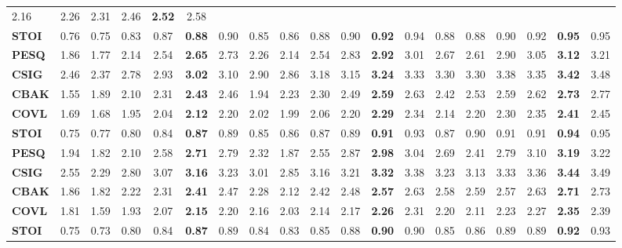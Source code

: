 \documentclass[10pt,twocolumn,letterpaper]{article}
\begin{document}
\begin{table*}[ht]
\begin{tabular}{l||ccc|cc|c||ccc|cc|c||ccc|cc|c}
                    2.16 & 2.26 & 2.31 & 2.46 & \textbf{2.52} & 2.58\\
    \textbf{STOI} & 0.76 & 0.75 & 0.83 & 0.87 & \textbf{0.88} & 0.90 &
                    0.85 & 0.86 & 0.88 & 0.90 & \textbf{0.92} & 0.94 &
                    0.88 & 0.88 & 0.90 & 0.92 & \textbf{0.95} & 0.95\\
    \hline
    \hline
    \textbf{PESQ} & 1.86 & 1.77 & 2.14 & 2.54 & \textbf{2.65} & 2.73 &
                    2.26 & 2.14 & 2.54 & 2.83 & \textbf{2.92} & 3.01 &
                    2.67 & 2.61 & 2.90 & 3.05 & \textbf{3.12} & 3.21\\
    \textbf{CSIG} & 2.46 & 2.37 & 2.78 & 2.93 & \textbf{3.02} & 3.10 &
                    2.90 & 2.86 & 3.18 & 3.15 & \textbf{3.24} & 3.33 &
                    3.30 & 3.30 & 3.38 & 3.35 & \textbf{3.42} & 3.48\\
    \textbf{CBAK} & 1.55 & 1.89 & 2.10 & 2.31 & \textbf{2.43} & 2.46 &
                    1.94 & 2.23 & 2.30 & 2.49 & \textbf{2.59} & 2.63 &
                    2.42 & 2.53 & 2.59 & 2.62 & \textbf{2.73} & 2.77\\
    \textbf{COVL} & 1.69 & 1.68 & 1.95 & 2.04 & \textbf{2.12} & 2.20 &
                    2.02 & 1.99 & 2.06 & 2.20 & \textbf{2.29} & 2.34 &
                    2.14 & 2.20 & 2.30 & 2.35 & \textbf{2.41} & 2.45\\
    \textbf{STOI} & 0.75 & 0.77 & 0.80 & 0.84 & \textbf{0.87} & 0.89 &
                    0.85 & 0.86 & 0.87 & 0.89 & \textbf{0.91} & 0.93 &
                    0.87 & 0.90 & 0.91 & 0.91 & \textbf{0.94} & 0.95\\
    \hline
    \hline
    \textbf{PESQ} & 1.94 & 1.82 & 2.10 & 2.58 & \textbf{2.71} & 2.79 &
                    2.32 & 1.87 & 2.55 & 2.87 & \textbf{2.98} & 3.04 &
                    2.69 & 2.41 & 2.79 & 3.10 & \textbf{3.19} & 3.22\\
    \textbf{CSIG} & 2.55 & 2.29 & 2.80 & 3.07 & \textbf{3.16} & 3.23 &
                    3.01 & 2.85 & 3.16 & 3.21 & \textbf{3.32} & 3.38 &
                    3.23 & 3.13 & 3.33 & 3.36 & \textbf{3.44} & 3.49\\
    \textbf{CBAK} & 1.86 & 1.82 & 2.22 & 2.31 & \textbf{2.41} & 2.47 &
                    2.28 & 2.12 & 2.42 & 2.48 & \textbf{2.57} & 2.63 &
                    2.58 & 2.59 & 2.57 & 2.63 & \textbf{2.71} & 2.73\\
    \textbf{COVL} & 1.81 & 1.59 & 1.93 & 2.07 & \textbf{2.15} & 2.20 &
                    2.16 & 2.03 & 2.14 & 2.17 & \textbf{2.26} & 2.31 &
                    2.20 & 2.11 & 2.23 & 2.27 & \textbf{2.35} & 2.39\\
    \textbf{STOI} & 0.75 & 0.73 & 0.80 & 0.84 & \textbf{0.87} & 0.89 &
                    0.84 & 0.83 & 0.85 & 0.88 & \textbf{0.90} & 0.90 &
                    0.85 & 0.86 & 0.89 & 0.89 & \textbf{0.92} & 0.93\\
    \hline
    \end{tabular}
    \label{quant}
\end{table*}
\end{document}
